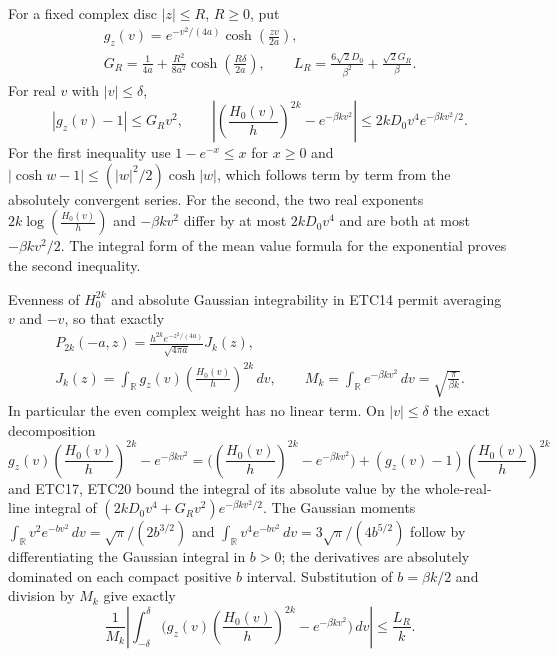 For a fixed complex disc $|z|\le R$, $R\ge0$, put
\begin{equation}\tag{ETC19}
\begin{gathered}
 g_z(v)=e^{-v^2/(4a)}\cosh\left(\frac{zv}{2a}\right),\\
 G_R=\frac1{4a}+\frac{R^2}{8a^2}
                      \cosh\left(\frac{R\delta}{2a}\right),
 \qquad
 L_R=\frac{6\sqrt2D_0}{\beta^2}+\frac{\sqrt2G_R}{\beta}.
\end{gathered}
\end{equation}
For real $v$ with $|v|\le\delta$,
\begin{equation}\tag{ETC20}
 |g_z(v)-1|\le G_Rv^2,\qquad
 |\left(\frac{H_0(v)}{h}\right)^{2k}-e^{-\beta kv^2}|
          \le2kD_0v^4e^{-\beta kv^2/2}.
\end{equation}
For the first inequality use $1-e^{-x}\le x$ for $x\ge0$
and
$|\cosh w-1|\le(|w|^2/2)\cosh|w|$, which follows
term by term from the absolutely convergent series.
For the second, the two real exponents
$2k\log\left(\frac{H_0(v)}{h}\right)$ and $-\beta kv^2$ differ by at most
$2kD_0v^4$ and are both at most $-\beta kv^2/2$.
The integral form of the mean value formula for the
exponential proves the second inequality.

Evenness of $H_0^{2k}$ and absolute Gaussian integrability in
ETC14 permit averaging $v$ and $-v$, so that exactly
\begin{equation}\tag{ETC21}
\begin{gathered}
 P_{2k}(-a,z)=\frac{h^{2k}e^{-z^2/(4a)}}{\sqrt{4\pi a}}
                              J_k(z),\\
 J_k(z)=\int_{\mathbb R}g_z(v)\left(\frac{H_0(v)}{h}\right)^{2k}\,dv,
 \qquad M_k=\int_{\mathbb R}e^{-\beta kv^2}\,dv
                    =\sqrt{\frac\pi{\beta k}}.
\end{gathered}
\end{equation}
In particular the even complex weight has no linear term.
On $|v|\le\delta$ the exact decomposition
\[
 g_z(v)\left(\frac{H_0(v)}{h}\right)^{2k}-e^{-\beta kv^2}
 =\bigl(\left(\frac{H_0(v)}{h}\right)^{2k}-e^{-\beta kv^2}\bigr)
       +(g_z(v)-1)\left(\frac{H_0(v)}{h}\right)^{2k}
\]
and ETC17, ETC20 bound the integral of its absolute value
by the whole-real-line integral of
$(2kD_0v^4+G_Rv^2)e^{-\beta kv^2/2}$.
The Gaussian moments
$\int_{\mathbb R}v^2e^{-bv^2}\,dv=\sqrt\pi/(2b^{3/2})$
and
$\int_{\mathbb R}v^4e^{-bv^2}\,dv=3\sqrt\pi/(4b^{5/2})$
follow by differentiating the Gaussian integral in $b>0$;
the derivatives are absolutely dominated on each compact
positive $b$ interval. Substitution of $b=\beta k/2$
and division by $M_k$ give exactly
\begin{equation}\tag{ETC22}
 \frac1{M_k}\left|\int_{-\delta}^{\delta}
    \bigl(g_z(v)\left(\frac{H_0(v)}{h}\right)^{2k}-e^{-\beta kv^2}\bigr)\,dv\right|
                         \le\frac{L_R}{k}.
\end{equation}

